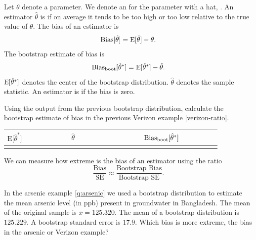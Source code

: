 
\bbox
\bi
\ii Let $\theta$ denote a parameter. We denote an \textbf{} for the parameter with a hat, \textbf{}.
\ii An estimator $\hat{\theta}$ is \textbf{} if on average it tends to be too high or too low relative to the true value of $\theta$. The bias of an estimator is
\[ \mbox{Bias}\lbrack \hat{\theta} \rbrack = \mbox{E} \lbrack \hat{\theta} \rbrack - \theta.\]
\ii The bootstrap estimate of bias is
\[ \mbox{Bias}_{\rm{boot}} \lbrack \hat{\theta}^{\ast} \rbrack =  \mbox{E} \lbrack \hat{\theta}^{\ast} \rbrack - \hat{\theta}.\]
\bi
\ii[$\circ$]  $\mbox{E} \lbrack \hat{\theta}^{\ast} \rbrack$ denotes the center of the bootstrap distribution.
\ii[$\circ$]  $\hat{\theta}$ denotes the sample statistic.
\ei
\ii An estimator is \textbf{} if the bias is zero.
\ei
\ebox


\bb[resume]
\ii  Using the output from the previous bootstrap distribution, calculate the bootstrap estimate of bias in the previous Verizon example \ref{verizon-ratio}. \bigskip

\begin{center}
\begin{tabular}{|l|l|l|}
$\mbox{E} \lbrack \hat{\theta}^{\ast} \rbrack$ \ \ \ \ \ \ \ \ \ \ & $\hat{\theta}$ \ \ \ \ \ \ \ \ \ \ \ \ \ \ \ & $\mbox{Bias}_{\rm boot} \lbrack \hat{\theta}^{\ast} \rbrack$ \ \ \ \ \ \ \ \ \\
\hline
 & & \\
 \end{tabular}
 \end{center}

\ee

\clearpage

\bbox
\bi
\ii We can measure how extreme is the bias of an estimator using the ratio
\[ \frac{\mbox{Bias}}{\mbox{SE}} \approx  \frac{\mbox{Bootstrap Bias}}{\mbox{Bootstrap SE}}.\]
\ii {}
\ei
\ebox

\bb[resume]
\ii In the arsenic example \ref{q:arsenic} we used a bootstrap distribution to estimate the mean arsenic level (in ppb)
present in groundwater in Bangladesh. The mean of the original sample is $\bar{x} = 125.320$. The mean
of a bootstrap distribution is $125.229$. A bootstrap standard error
is $17.9$. Which bias is more extreme, the bias in the arsenic or Verizon example?
\ee

